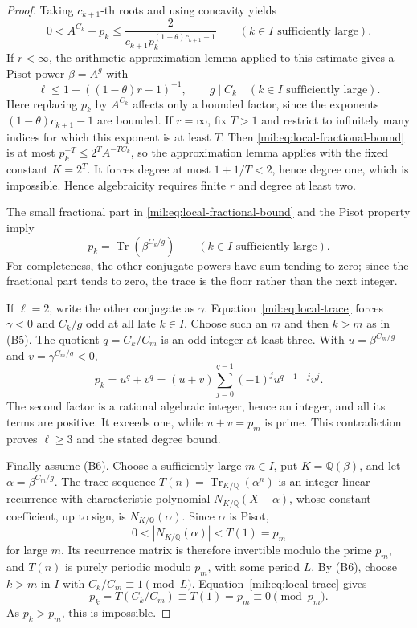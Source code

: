 \documentclass[11pt,a4paper]{article}
\theoremstyle{definition}
\theoremstyle{remark}
\numberwithin{equation}{section}
\begin{document}
\begin{proof}
Taking $c_{k+1}$-th roots and using concavity yields
\begin{equation}
 0< A^{C_k}-p_k\leq
 \frac{2}{c_{k+1}p_k^{(1-\theta)c_{k+1}-1}}
 \qquad(k\in I\text{ sufficiently large}).
 \label{mil:eq:local-fractional-bound}
\end{equation}
If $r<\infty$, the arithmetic approximation lemma applied to this estimate gives a Pisot power $\beta=A^g$ with
\[
 \ell\leq1+((1-\theta)r-1)^{-1},
 \qquad g\mid C_k\quad(k\in I\text{ sufficiently large}).
\]
Here replacing $p_k$ by $A^{C_k}$ affects only a bounded factor, since the exponents $(1-\theta)c_{k+1}-1$ are bounded. If $r=\infty$, fix $T>1$ and restrict to infinitely many indices for which this exponent is at least $T$. Then \eqref{mil:eq:local-fractional-bound} is at most $p_k^{-T}\leq 2^T A^{-TC_k}$, so the approximation lemma applies with the fixed constant $K=2^T$. It forces degree at most $1+1/T<2$, hence degree one, which is impossible. Hence algebraicity requires finite $r$ and degree at least two.

The small fractional part in \eqref{mil:eq:local-fractional-bound} and the Pisot property imply
\begin{equation}
 p_k=\operatorname{Tr}(\beta^{C_k/g})
 \qquad(k\in I\text{ sufficiently large}).
 \label{mil:eq:local-trace}
\end{equation}
For completeness, the other conjugate powers have sum tending to zero; since the fractional part tends to zero, the trace is the floor rather than the next integer.

If $\ell=2$, write the other conjugate as $\gamma$. Equation~\eqref{mil:eq:local-trace} forces $\gamma<0$ and $C_k/g$ odd at all late $k\in I$. Choose such an $m$ and then $k>m$ as in (B5). The quotient $q=C_k/C_m$ is an odd integer at least three. With $u=\beta^{C_m/g}$ and $v=\gamma^{C_m/g}<0$,
\[
 p_k=u^q+v^q=(u+v)
 \sum_{j=0}^{q-1}(-1)^j u^{q-1-j}v^j.
\]
The second factor is a rational algebraic integer, hence an integer, and all its terms are positive. It exceeds one, while $u+v=p_m$ is prime. This contradiction proves $\ell\geq3$ and the stated degree bound.

Finally assume (B6). Choose a sufficiently large $m\in I$, put $K=\mathbb Q(\beta)$, and let $\alpha=\beta^{C_m/g}$. The trace sequence $T(n)=\operatorname{Tr}_{K/\mathbb Q}(\alpha^n)$ is an integer linear recurrence with characteristic polynomial $N_{K/\mathbb Q}(X-\alpha)$, whose constant coefficient, up to sign, is $N_{K/\mathbb Q}(\alpha)$. Since $\alpha$ is Pisot,
\[
 0<|N_{K/\mathbb Q}(\alpha)|<T(1)=p_m
\]
for large $m$. Its recurrence matrix is therefore invertible modulo the prime $p_m$, and $T(n)$ is purely periodic modulo $p_m$, with some period $L$. By (B6), choose $k>m$ in $I$ with $C_k/C_m\equiv1\pmod L$. Equation~\eqref{mil:eq:local-trace} gives
\[
 p_k=T(C_k/C_m)\equiv T(1)=p_m\equiv0\pmod{p_m}.
\]
As $p_k>p_m$, this is impossible.
\end{proof}
\end{document}
